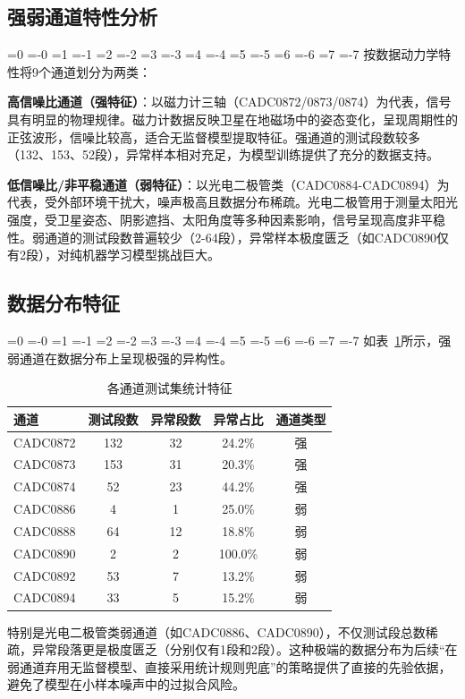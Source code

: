 \documentclass[12pt, a4paper]{article}
\newcommand{\zihao}[1]{%
    \ifnum#1=0 {\fontsize{42pt}{50pt}\selectfont}%
    \else\ifnum#1=-0 {\fontsize{36pt}{44pt}\selectfont}%
    \else\ifnum#1=1 {\fontsize{26pt}{32pt}\selectfont}%
    \else\ifnum#1=-1 {\fontsize{24pt}{28pt}\selectfont}%
    \else\ifnum#1=2 {\fontsize{22pt}{26pt}\selectfont}%
    \else\ifnum#1=-2 {\fontsize{18pt}{22pt}\selectfont}%
    \else\ifnum#1=3 {\fontsize{16pt}{20pt}\selectfont}%
    \else\ifnum#1=-3 {\fontsize{15pt}{18pt}\selectfont}%
    \else\ifnum#1=4 {\fontsize{14pt}{17pt}\selectfont}%
    \else\ifnum#1=-4 {\fontsize{12pt}{15pt}\selectfont}%
    \else\ifnum#1=5 {\fontsize{10.5pt}{13pt}\selectfont}%
    \else\ifnum#1=-5 {\fontsize{9pt}{11pt}\selectfont}%
    \else\ifnum#1=6 {\fontsize{7.5pt}{9pt}\selectfont}%
    \else\ifnum#1=-6 {\fontsize{6.5pt}{8pt}\selectfont}%
    \else\ifnum#1=7 {\fontsize{5.5pt}{7pt}\selectfont}%
    \else\ifnum#1=-7 {\fontsize{5pt}{6pt}\selectfont}%
    \fi\fi\fi\fi\fi\fi\fi\fi\fi\fi\fi\fi\fi\fi\fi\fi
}
\newcommand{\songti}{\CJKfontspec{SimSun}}
\begin{document}
\subsection{强弱通道特性分析}

\zihao{5}\songti
按数据动力学特性将9个通道划分为两类：

\textbf{高信噪比通道（强特征）}：以磁力计三轴（CADC0872/0873/0874）为代表，信号具有明显的物理规律。磁力计数据反映卫星在地磁场中的姿态变化，呈现周期性的正弦波形，信噪比较高，适合无监督模型提取特征。强通道的测试段数较多（132、153、52段），异常样本相对充足，为模型训练提供了充分的数据支持。

\textbf{低信噪比/非平稳通道（弱特征）}：以光电二极管类（CADC0884-CADC0894）为代表，受外部环境干扰大，噪声极高且数据分布稀疏。光电二极管用于测量太阳光强度，受卫星姿态、阴影遮挡、太阳角度等多种因素影响，信号呈现高度非平稳性。弱通道的测试段数普遍较少（2-64段），异常样本极度匮乏（如CADC0890仅有2段），对纯机器学习模型挑战巨大。

\subsection{数据分布特征}

\zihao{5}\songti
如表~\ref{tab:channel_stats}所示，强弱通道在数据分布上呈现极强的异构性。

\begin{table}[H]
\centering
\caption{各通道测试集统计特征}
\label{tab:channel_stats}
\begin{tabular}{lcccc}
\toprule
通道 & 测试段数 & 异常段数 & 异常占比 & 通道类型 \\
\midrule
CADC0872 & 132 & 32 & 24.2\% & 强 \\
CADC0873 & 153 & 31 & 20.3\% & 强 \\
CADC0874 & 52 & 23 & 44.2\% & 强 \\
CADC0886 & 4 & 1 & 25.0\% & 弱 \\
CADC0888 & 64 & 12 & 18.8\% & 弱 \\
CADC0890 & 2 & 2 & 100.0\% & 弱 \\
CADC0892 & 53 & 7 & 13.2\% & 弱 \\
CADC0894 & 33 & 5 & 15.2\% & 弱 \\
\bottomrule
\end{tabular}
\end{table}

特别是光电二极管类弱通道（如CADC0886、CADC0890），不仅测试段总数稀疏，异常段落更是极度匮乏（分别仅有1段和2段）。这种极端的数据分布为后续``在弱通道弃用无监督模型、直接采用统计规则兜底''的策略提供了直接的先验依据，避免了模型在小样本噪声中的过拟合风险。
\end{document}
